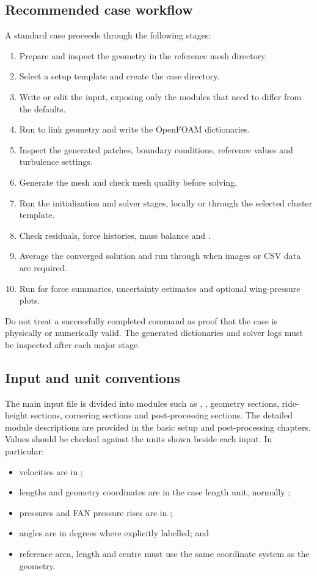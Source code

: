 \subsection{Recommended case workflow}

A standard case proceeds through the following stages:
\begin{enumerate}
    \item Prepare and inspect the geometry in the reference mesh directory.
    \item Select a setup template and create the case directory.
    \item Write or edit the  input, exposing only the modules that need to differ from the defaults.
    \item Run  to link geometry and write the OpenFOAM dictionaries.
    \item Inspect the generated patches, boundary conditions, reference values and turbulence settings.
    \item Generate the mesh and check mesh quality before solving.
    \item Run the initialization and solver stages, locally or through the selected cluster template.
    \item Check residuals, force histories, mass balance and .
    \item Average the converged solution and run  through  when images or CSV data are required.
    \item Run  for force summaries, uncertainty estimates and optional wing-pressure plots.
\end{enumerate}

Do not treat a successfully completed command as proof that the case is physically or numerically valid. The generated dictionaries and solver logs must be inspected after each major stage.

\subsection{Input and unit conventions}

The main input file is divided into modules such as , , geometry sections, ride-height sections, cornering sections and post-processing sections. The detailed module descriptions are provided in the basic setup and post-processing chapters. Values should be checked against the units shown beside each input. In particular:
\begin{itemize}
    \item velocities are in ;
    \item lengths and geometry coordinates are in the case length unit, normally ;
    \item pressures and FAN pressure rises are in ;
    \item angles are in degrees where explicitly labelled; and
    \item reference area, length and centre must use the same coordinate system as the geometry.
\end{itemize}

